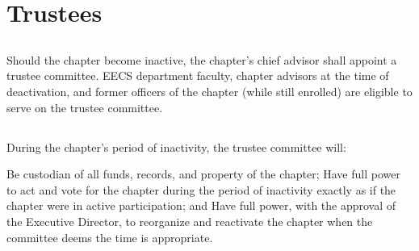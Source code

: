 \chapter{Trustees}\label{sec:trustees}

\section{}
Should the chapter become inactive, the chapter's chief advisor shall appoint a trustee committee. EECS department faculty, chapter advisors at the time of deactivation, and former officers of the chapter (while still enrolled) are eligible to serve on the trustee committee.

\section{}
During the chapter's period of inactivity, the trustee committee will:



\begin{enumsubsection}

\itemnotoc Be custodian of all funds, records, and property of the chapter;
\itemnotoc Have full power to act and vote for the chapter during the period of inactivity exactly as if the chapter were in active participation; and
\itemnotoc Have full power, with the approval of the \hkn Executive Director, to reorganize and reactivate the chapter when the committee deems the time is appropriate.

\end{enumsubsection}
